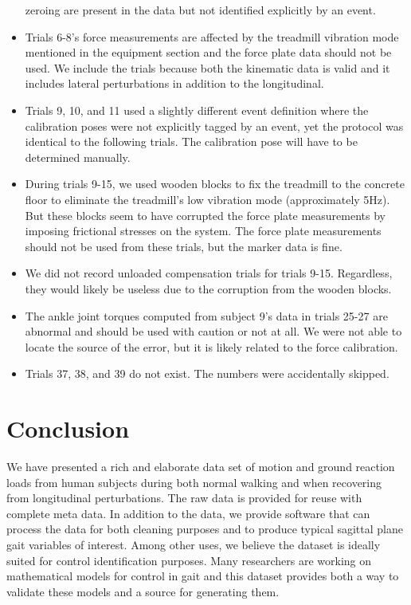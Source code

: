 \documentclass[fleqn,12pt]{wlpeerj}
\begin{document}
\begin{itemize}
    zeroing are present in the data but not identified explicitly by an event.
  \item  Trials 6-8's force measurements are affected by the treadmill
    vibration mode mentioned in the equipment section and the force plate data
    should not be used. We include the trials because both the kinematic data
    is valid and it includes lateral perturbations in addition to the
    longitudinal.
  \item Trials 9, 10, and 11 used a slightly different event definition where the
    calibration poses were not explicitly tagged by an event, yet the protocol
    was identical to the following trials. The calibration pose will have to be
    determined manually.
  \item During trials 9-15, we used wooden blocks to fix the treadmill to the
    concrete floor to eliminate the treadmill's low vibration mode
    (approximately 5\si{\hertz}). But these blocks seem to have corrupted the
    force plate measurements by imposing frictional stresses on the system. The
    force plate measurements should not be used from these trials, but the
    marker data is fine.
  \item We did not record unloaded compensation trials for trials 9-15.
    Regardless, they would likely be useless due to the corruption from the
    wooden blocks.
  \item The ankle joint torques computed from subject 9's data in trials 25-27
    are abnormal and should be used with caution or not at all. We were not
    able to locate the source of the error, but it is likely related to the
    force calibration.
  \item Trials 37, 38, and 39 do not exist. The numbers were accidentally
    skipped.
\end{itemize}

\section*{Conclusion}
%
We have presented a rich and elaborate data set of motion and ground reaction
loads from human subjects during both normal walking and when recovering from
longitudinal perturbations. The raw data is provided for reuse with complete
meta data. In addition to the data, we provide software that can process the
data for both cleaning purposes and to produce typical sagittal plane gait
variables of interest. Among other uses, we believe the dataset is ideally
suited for control identification purposes. Many researchers are working on
mathematical models for control in gait and this dataset provides both a way to
validate these models and a source for generating them.
\end{document}
